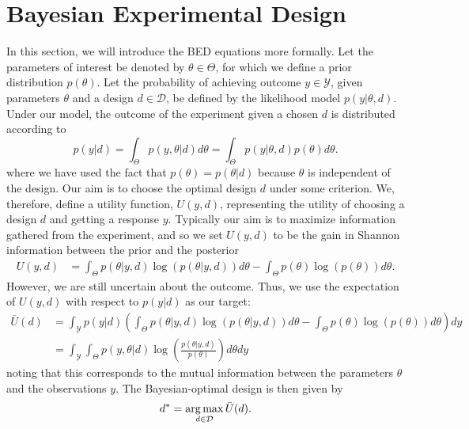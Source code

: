 
\section{Bayesian Experimental Design}
\label{sec:design:bed}

In this section, we will introduce the BED equations more formally.
Let the parameters of interest be denoted by $\theta \in \Theta$, for which we define a prior distribution $p(\theta)$.
Let the probability of achieving outcome $y\in\mathcal{Y}$, given parameters $\theta$ 
and a design $d \in \mathcal{D}$, be defined by the likelihood model $p(y | \theta, d)$.
Under our model, the outcome of the experiment given a chosen $d$ is distributed according to
\begin{equation}
\label{eq:marginal_def}
p(y | d) = \int_{\Theta} p(y,\theta | d) d\theta = \int_{\Theta} p(y | \theta, d) p(\theta) d\theta.
\end{equation}
where we have used the fact that $p(\theta)=p(\theta|d)$ because $\theta$ is independent of the design.
Our aim is to choose the optimal design $d$ under some criterion. 
We, therefore, define a utility function, $U(y,d)$, representing the utility of choosing a design $d$ 
and getting a response $y$.
Typically our aim is to maximize information gathered from the experiment, and so we set 
$U(y,d)$ to be the gain in Shannon information between the prior and the posterior
\begin{align}
\label{eq:shannon_inf}
U(y,d) &= \int_{\Theta} p(\theta |y, d) \log(p(\theta |y, d)) d\theta -\int_{\Theta} p(\theta) \log(p(\theta))d\theta.
\end{align}
However, we are still uncertain about the outcome. Thus, we use the expectation of $U(y,d)$ with respect to $p(y | d)$
as our target:
\begin{align}
\bar{U}(d) 
&=\int_{\mathcal{Y}} p(y|d) \left(
\int_{\Theta} p(\theta | y, d)\log(p(\theta |y, d)) d\theta - 
\int_{\Theta} p(\theta) \log(p(\theta)) d\theta \right) dy \nonumber\\
&=\int_{\mathcal{Y}}\int_{\Theta} p(y,\theta | d)\log\left(\frac{p(\theta |y, d)}{p(\theta)}\right)d\theta dy
\label{eq:u_bar_1}
\end{align}
noting that this corresponds to the mutual information between the parameters $\theta$ and
the observations $y$.  The Bayesian-optimal design is then given by
\begin{equation}
\label{eq:d_star}
d^* = \operatorname*{arg\,max}_{d \in \mathcal{D}} \bar{U}(d).
\end{equation}
